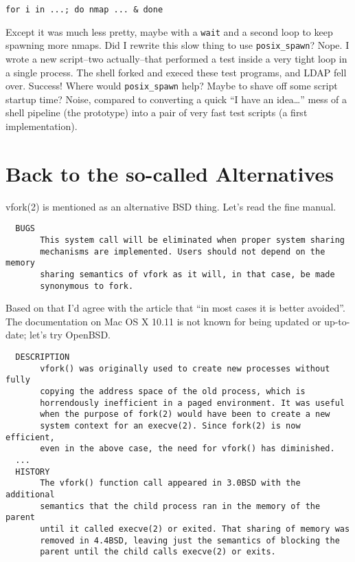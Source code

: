 \documentclass[10pt,a4paper]{article}
\begin{document}
\begin{lstlisting}
for i in ...; do nmap ... & done
\end{lstlisting}

Except it was much less pretty, maybe with a \texttt{wait} and a second
loop to keep spawning more nmaps. Did I rewrite this slow thing to use
\texttt{posix\_spawn}? Nope. I wrote a new script--two actually--that
performed a test inside a very tight loop in a single process. The shell
forked and execed these test programs, and LDAP fell over. Success!
Where would \texttt{posix\_spawn} help? Maybe to shave off some script
startup time? Noise, compared to converting a quick ``I have an
idea\ldots'' mess of a shell pipeline (the prototype) into a pair of
very fast test scripts (a first implementation).

\section*{Back to the so-called Alternatives}

vfork(2) is mentioned as an alternative BSD thing. Let's read the
fine manual.

\begin{lstlisting}
  BUGS
       This system call will be eliminated when proper system sharing
       mechanisms are implemented. Users should not depend on the memory
       sharing semantics of vfork as it will, in that case, be made
       synonymous to fork.
\end{lstlisting}

Based on that I'd agree with the article that ``in most cases it is
better avoided''\citep[p.5]{Hotos2019}. The documentation on Mac OS X
10.11 is not known for being updated or up-to-date; let's try OpenBSD.

\begin{lstlisting}
  DESCRIPTION
       vfork() was originally used to create new processes without fully
       copying the address space of the old process, which is
       horrendously inefficient in a paged environment. It was useful
       when the purpose of fork(2) would have been to create a new
       system context for an execve(2). Since fork(2) is now efficient,
       even in the above case, the need for vfork() has diminished.
  ...
  HISTORY
       The vfork() function call appeared in 3.0BSD with the additional
       semantics that the child process ran in the memory of the parent
       until it called execve(2) or exited. That sharing of memory was
       removed in 4.4BSD, leaving just the semantics of blocking the
       parent until the child calls execve(2) or exits.
\end{lstlisting}
\end{document}
